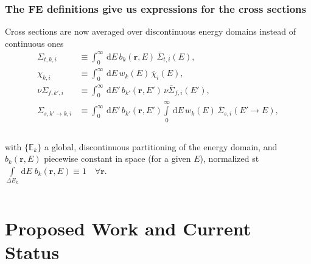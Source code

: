 \documentclass[compress,10pt]{beamer}
\newcommand{\ud}{\,\mathrm{d}}
\renewcommand{\vec}[1]{\mathbf{#1}}
\begin{document}
\begin{frame}
\end{frame}

\typeout{***********************************************************************************}

\begin{frame}
   \frametitle{The FE definitions give us expressions for the cross sections}

   \vspace{-0.5mm}

\begin{block}{\footnotesize Cross sections are now averaged over discontinuous energy domains instead of continuous ones}
   \vspace{-3.7mm}
   \begin{align*}
\Sigma_{t,k,i} &\equiv \int_{0}^{\infty} \ud{E}\, b_{k}(\vec{r}, E) \, \overline{\Sigma}_{t,i}(E), \\
\chi_{k,i} &\equiv \int_{0}^{\infty} \ud{E}\, w_{k}(E)\, \overline{\chi}_i(E), \\
\nu \Sigma_{f,k',i} &\equiv \int_{0}^{\infty} \ud{E'}\, b_{k'}(\vec{r}, E') \,\nu\overline{\Sigma}_{f,i}(E'), \\
\Sigma_{s, k' \rightarrow k,i} &\equiv \int_{0}^{\infty} \ud{E'}\, b_{k'}(\vec{r}, E') \int\limits_{0}^{\infty} \ud{E}\, w_k(E)\, \overline{\Sigma}_{s,i}(E' \rightarrow E),
\end{align*}
%
\vspace{-1mm}
\begin{columns}
with $\{\mathbb{E}_{k}\}$ a global, discontinuous partitioning of the energy domain, and $b_{k}(\vec{r}, E)$ piecewise constant in space (for a given $E$), normalized st $\int\limits_{\Delta E_{k}} \ud{E} \;b_{k}(\vec{r}, E)\equiv 1 \quad \forall \vec{r}$.
\end{columns}


\end{block}

\end{frame}

%
\section{Proposed Work and Current Status}
\end{document}
